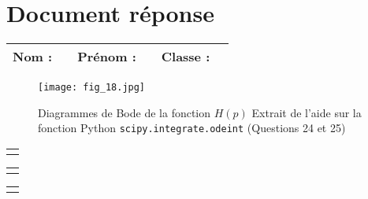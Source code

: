\section*{Document réponse}
\begin{center}
\begin{tabular}{p{}p{}|p{}p{}|p{}p{}}
\textbf{Nom : } & &
\textbf{Prénom : } &  &
\textbf{Classe : } &  \\
\hline
\end{tabular}
\end{center}

\begin{figure}[H]
\centering
\texttt{[image: fig\_18.jpg]}
\caption{\label{fig:C} Diagrammes de Bode de la fonction $H(p)$ Extrait de l'aide sur la fonction Python \texttt{scipy.integrate.odeint} (Questions 24 et 25)}
\end{figure}


\fi

\newpage

\begin{tabular}{p{}}
\\
\hline
\\
\end{tabular}

\newpage

\begin{tabular}{p{}}
\\
\hline
\\
\end{tabular}

\newpage

\begin{tabular}{p{}}
\\
\hline
\\
\end{tabular}